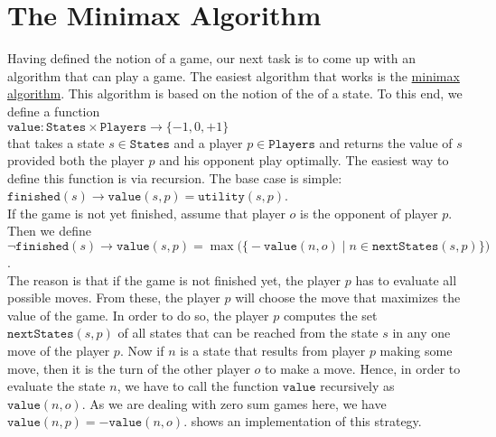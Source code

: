 \section{The Minimax Algorithm}
Having defined the notion of a game, our next task is to come up with an algorithm that can play a game.  The
easiest algorithm that works is the \href{https://en.wikipedia.org/wiki/Minimax}{minimax algorithm}.  This
algorithm is based on the notion of the  of a state.  To this end, we define a function
\\[0.2cm]
\hspace*{1.3cm}
$\texttt{value}: \texttt{States} \times \texttt{Players} \rightarrow \{-1, 0, +1\}$
\\[0.2cm]
that takes a state $s \in \texttt{States}$ and a player $p \in \texttt{Players}$ and returns the value of $s$ provided both the player $p$ and his
opponent play optimally.  The easiest way to define this function is via recursion.  The base case is simple:
\\[0.2cm]
\hspace*{1.3cm}
$\texttt{finished}(s) \rightarrow \texttt{value}(s, p) = \texttt{utility}(s, p)$.
\\[0.2cm]
If the game is not yet finished, assume that player $o$ is the opponent of player $p$.  Then we define
\\[0.2cm]
\hspace*{1.3cm}
$\neg \texttt{finished}(s) \rightarrow 
 \texttt{value}(s, p) = \max\bigl(\bigl\{
                     -\texttt{value}(n, o) \mid n \in \texttt{nextStates}(s, p)
                     \bigr\}\bigr)
$.
\\[0.2cm]
The reason is that if the game is not finished yet, the player $p$ has to evaluate all possible moves.  
From these, the player $p$ will choose the move that maximizes the value of the game.  In order to do so, the
player $p$ computes the set 
$\texttt{nextStates}(s, p)$ of all states that can be reached from the state $s$ in any one move of the player $p$.
Now if $n$ is a state that results from player $p$ making some move, then it is the turn of the other player
$o$ to make a move.  Hence, in order to evaluate the state $n$, we have to call the function $\texttt{value}$
recursively as $\texttt{value}(n,o)$.  As we are dealing with zero sum games here, we have $\texttt{value}(n, p) = -\texttt{value}(n, o)$.
 shows an implementation of this strategy.


